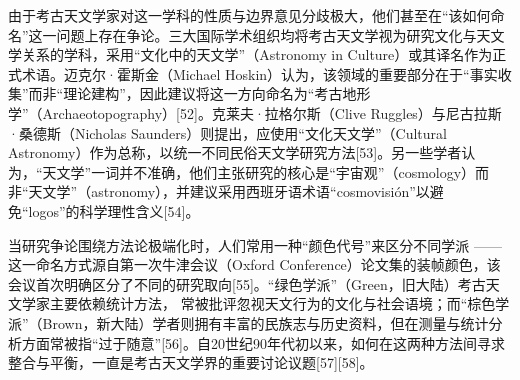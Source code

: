 由于考古天文学家对这一学科的性质与边界意见分歧极大，他们甚至在“该如何命名”这一问题上存在争论。三大国际学术组织均将考古天文学视为研究文化与天文学关系的学科，采用“文化中的天文学”（Astronomy in Culture）或其译名作为正式术语。迈克尔·霍斯金（Michael Hoskin）认为，该领域的重要部分在于“事实收集”而非“理论建构”，因此建议将这一方向命名为“考古地形学”（Archaeotopography）[52]。克莱夫·拉格尔斯（Clive Ruggles）与尼古拉斯·桑德斯（Nicholas Saunders）则提出，应使用“文化天文学”（Cultural Astronomy）作为总称，以统一不同民俗天文学研究方法[53]。另一些学者认为，“天文学”一词并不准确，他们主张研究的核心是“宇宙观”（cosmology）而非“天文学”（astronomy），并建议采用西班牙语术语“cosmovisión”以避免“logos”的科学理性含义[54]。

当研究争论围绕方法论极端化时，人们常用一种“颜色代号”来区分不同学派 —— 这一命名方式源自第一次牛津会议（Oxford Conference）论文集的装帧颜色，该会议首次明确区分了不同的研究取向[55]。“绿色学派”（Green，旧大陆）考古天文学家主要依赖统计方法，  
常被批评忽视天文行为的文化与社会语境；而“棕色学派”（Brown，新大陆）学者则拥有丰富的民族志与历史资料，但在测量与统计分析方面常被指“过于随意”[56]。自20世纪90年代初以来，如何在这两种方法间寻求整合与平衡，一直是考古天文学界的重要讨论议题[57][58]。

